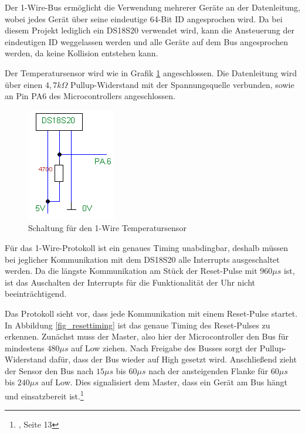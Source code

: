 Der 1-Wire-Bus ermöglicht die Verwendung mehrerer Geräte an der Datenleitung, wobei jedes Gerät über seine eindeutige 64-Bit ID angesprochen wird. Da bei diesem Projekt lediglich ein DS18S20 verwendet wird, kann die Ansteuerung der eindeutigen ID weggelassen werden und alle Geräte auf dem Bus angesprochen werden, da keine Kollision entstehen kann.

Der Temperatursensor wird wie in Grafik \ref{fig_tempsensor} angeschlossen. Die Datenleitung wird über einen $4,7 k\Omega$ Pullup-Widerstand mit der Spannungsquelle verbunden, sowie an Pin PA6 des Microcontrollers angeschlossen.
%
\begin{figure}[htp]
\centering
\includegraphics{skizzen/temperatursensor_schematic.png}
\caption{Schaltung für den 1-Wire Temperatursensor}\label{fig_tempsensor}
\end{figure}
%
Für das 1-Wire-Protokoll ist ein genaues Timing unabdingbar, deshalb müssen bei jeglicher Kommunikation mit dem DS18S20 alle Interrupts ausgeschaltet werden. Da die längste Kommunikation am Stück der Reset-Pulse mit $960 \mu s$ ist, ist das Auschalten der Interrupts für die Funktionalität der Uhr nicht beeinträchtigend.

Das Protokoll sieht vor, dass jede Kommunikation mit einem Reset-Pulse startet. In Abbildung \ref{fig_resettiming} 
ist das genaue Timing des Reset-Pulses zu erkennen. Zunächst muss der Master, also hier der Microcontroller den Bus für mindestens $480 \mu s$ auf Low ziehen. Nach Freigabe des Busses sorgt der Pullup-Widerstand dafür, dass der Bus wieder auf High gesetzt wird. Anschließend zieht der Sensor den Bus nach $15 \mu s$ bis $60 \mu s$ nach der ansteigenden Flanke für $60 \mu s$ bis $240 \mu s$ auf Low. Dies signalisiert dem Master, dass ein Gerät am Bus hängt und einsatzbereit ist.\footnote{\cite{ds18s20}, Seite 13}

